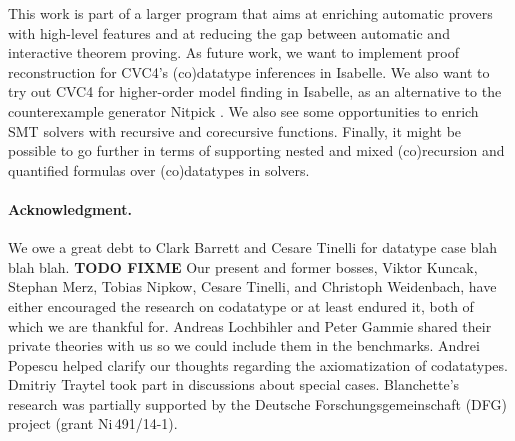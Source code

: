 This work is part of a larger program that aims at enriching automatic provers
with high-level features and at reducing the gap between automatic and
interactive theorem proving. As future work, we want to implement proof
reconstruction for CVC4's (co)datatype inferences in Isabelle. We also want to
try out CVC4 for higher-order model finding in Isabelle, as an alternative to
the counterexample generator Nitpick \cite{blanchette-nipkow-2010}. We also
see some opportunities to enrich SMT solvers with recursive and corecursive
functions. Finally, it might be possible to go further in terms of supporting
nested and mixed (co)recursion and quantified formulas over (co)datatypes in
solvers.

\def\ackname{Acknowledgment}
\paragraph{\ackname.}
We owe a great debt to Clark Barrett and Cesare Tinelli for datatype case blah
blah blah. \textbf{TODO FIXME}
%
Our present and former bosses, Viktor Kuncak, Stephan Merz, Tobias Nipkow,
Cesare Tinelli, and Christoph Weidenbach, have either encouraged the research on
codatatype or at least endured
it, both of which we are thankful for.
%
Andreas Lochbihler and Peter Gammie shared their private
theories with us so we could include them in the benchmarks.
Andrei Popescu helped clarify our thoughts regarding the axiomatization of
codatatypes. Dmitriy Traytel took part in discussions about special
cases.
%
Blanchette's research was partially supported by the Deutsche
Forschungs\-gemein\-schaft (DFG) project
 (grant Ni\,491\slash 14-1).


{}


